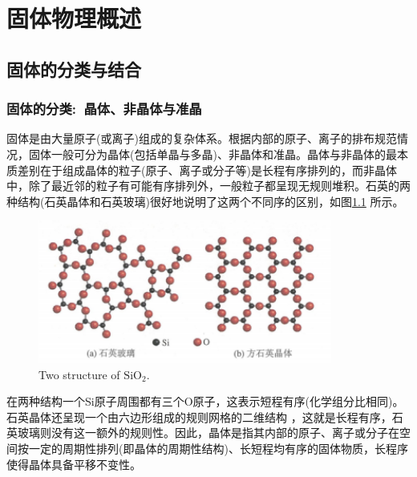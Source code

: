 \setcounter{chapter}{7}
\chapter{固体物理概述}\label{chap:Solid-state_introduct}
\section{固体的分类与结合}
\subsection{固体的分类:~晶体、非晶体与准晶}
固体是由大量原子(或离子)组成的复杂体系。根据内部的原子、离子的排布规范情况，固体一般可分为晶体(包括单晶与多晶)、非晶体和准晶。晶体与非晶体的最本质差别在于组成晶体的粒子(原子、离子或分子等)是长程有序排列的，而非晶体中，除了最近邻的粒子有可能有序排列外，一般粒子都呈现无规则堆积。石英的两种结构(石英晶体和石英玻璃)很好地说明了这两个不同序的区别，如图\ref{Fig:SSI-01} 所示。
\begin{figure}[h!]
\centering
\vspace*{-0.18in}
\includegraphics[height=1.85in,width=3.8in,viewport=0 0 84 40,clip]{Figures/2D-SiO2.png}
\caption{\small \textrm{Two structure of $\mathrm{SiO}_2$.}}%
\label{Fig:SSI-01}
\end{figure}
在两种结构一个Si原子周围都有三个O原子，这表示短程有序(化学组分比相同)。石英晶体还呈现一个由六边形组成的规则网格的二维结构 ，这就是长程有序，石英玻璃则没有这一额外的规则性。因此，{\heiti 晶体是指其内部的原子、离子或分子在空间按一定的周期性排列(即晶体的周期性结构)、长短程均有序的固体物质，长程序使得晶体具备平移不变性。}


